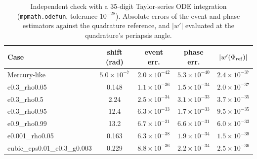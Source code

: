 \begin{table}[!htbp]
\centering
\caption{Independent check with a 35-digit Taylor-series ODE integration (\texttt{mpmath.odefun}, tolerance $10^{-28}$). Absolute errors of the event and phase estimators against the quadrature reference, and $|w'|$ evaluated at the quadrature's periapsis angle.}
\label{tab:hp}
\small
\begin{tabular}{lcccc}
\toprule
Case & shift (rad) & event err. & phase err. & $|w'(\Phi_{\rm ref})|$ \\
\midrule
Mercury-like & $5.0\times10^{-7}$ & $2.0\times10^{-42}$ & $5.3\times10^{-40}$ & $2.4\times10^{-37}$ \\
e0.3\_rho0.05 & 0.148 & $1.1\times10^{-36}$ & $1.5\times10^{-34}$ & $2.0\times10^{-37}$ \\
e0.3\_rho0.5 & 2.24 & $2.5\times10^{-34}$ & $3.1\times10^{-33}$ & $3.7\times10^{-35}$ \\
e0.3\_rho0.95 & 12.4 & $6.3\times10^{-33}$ & $1.7\times10^{-33}$ & $9.5\times10^{-35}$ \\
e0.9\_rho0.99 & 13.2 & $6.7\times10^{-31}$ & $6.6\times10^{-31}$ & $6.0\times10^{-33}$ \\
e0.001\_rho0.05 & 0.163 & $6.3\times10^{-38}$ & $1.9\times10^{-34}$ & $1.5\times10^{-39}$ \\
cubic\_eps0.01\_e0.3\_g0.003 & 0.229 & $8.8\times10^{-36}$ & $2.2\times10^{-34}$ & $2.5\times10^{-36}$ \\
\bottomrule
\end{tabular}
\end{table}
